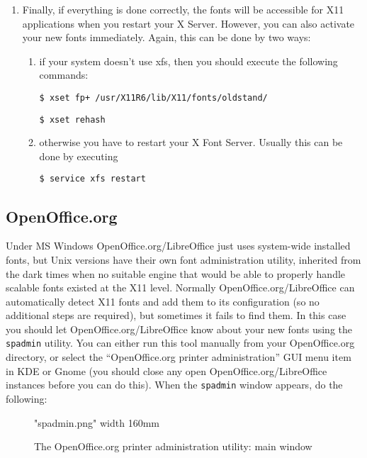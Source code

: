 \documentclass[12pt,a4paper,openany]{book}
\begin{document}
\begin{enumerate}
\begin{enumerate}
\end{enumerate}

\item Finally, if everything is done correctly, the fonts will be
accessible for X11 applications when you restart your X Server. However,
you can also activate your new fonts immediately. Again, this can be done
by two ways:

\begin{enumerate}

\item if your system doesn’t use xfs, then you should execute the following
commands:

\texttt{\$ xset fp+ /usr/X11R6/lib/X11/fonts/oldstand/}

\texttt{\$ xset rehash}

\item otherwise you have to restart your X Font Server. Usually this
can be done by executing

\texttt{\$ service xfs restart}

\end{enumerate}

\end{enumerate}

\subsection{OpenOffice.org}

Under MS Windows OpenOffice.org/LibreOffice just uses system-wide installed
fonts, but Unix versions have their own font administration utility,
inherited from the dark times when no suitable engine that would be able
to properly handle scalable fonts existed at the X11 level. Normally
OpenOffice.org/LibreOffice can automatically detect X11 fonts and add
them to its configuration (so no additional steps are required), but
sometimes it fails to find them. In this case you should let
OpenOffice.org/LibreOffice know about your new fonts using the \texttt{spadmin}
utility. You can either run this tool manually from your OpenOffice.org
directory, or select the “OpenOffice.org printer administration” GUI menu
item in KDE or Gnome (you should close any open OpenOffice.org/LibreOffice 
instances before you can do this). When the \texttt{spadmin} window appears, 
do the following:

\begin{figure}[htb]

\centerline{\XeTeXpicfile "spadmin.png" width 160mm}

\caption{The OpenOffice.org printer administration utility: main window}

\hypertarget{fig:spadmin}{}\label{fig:spadmin}

\end{figure}
\end{document}
